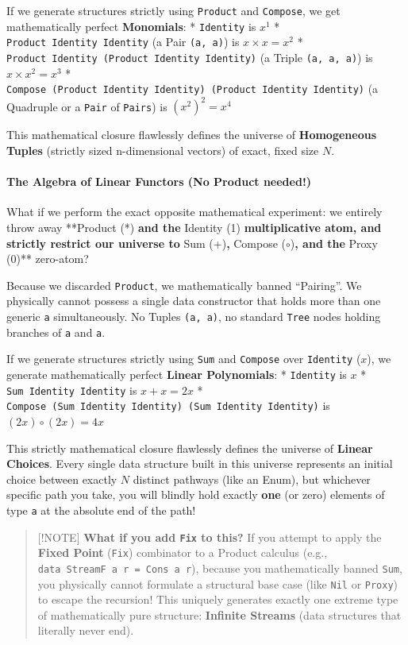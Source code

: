 \documentclass[
]{article}
\begin{document}
If we generate structures strictly using \texttt{Product} and
\texttt{Compose}, we get mathematically perfect \textbf{Monomials}: *
\texttt{Identity} is \(x^1\) * \texttt{Product\ Identity\ Identity} (a
Pair \texttt{(a,\ a)}) is \(x \times x = x^2\) *
\texttt{Product\ Identity\ (Product\ Identity\ Identity)} (a Triple
\texttt{(a,\ a,\ a)}) is \(x \times x^2 = x^3\) *
\texttt{Compose\ (Product\ Identity\ Identity)\ (Product\ Identity\ Identity)}
(a Quadruple or a \texttt{Pair} of \texttt{Pairs}) is \((x^2)^2 = x^4\)

This mathematical closure flawlessly defines the universe of
\textbf{Homogeneous Tuples} (strictly sized n-dimensional vectors) of
exact, fixed size \(N\).

\paragraph{The Algebra of Linear Functors (No Product
needed!)}\label{the-algebra-of-linear-functors-no-product-needed}

What if we perform the exact opposite mathematical experiment: we
entirely throw away **Product (*)\textbf{ and the }Identity (1)\textbf{
multiplicative atom, and strictly restrict our universe to }Sum
(+)\textbf{, }Compose (\(\circ\))\textbf{, and the }Proxy (0)**
zero-atom?

Because we discarded \texttt{Product}, we mathematically banned
``Pairing''. We physically cannot possess a single data constructor that
holds more than one generic \texttt{a} simultaneously. No Tuples
\texttt{(a,\ a)}, no standard \texttt{Tree} nodes holding branches of
\texttt{a} and \texttt{a}.

If we generate structures strictly using \texttt{Sum} and
\texttt{Compose} over \texttt{Identity} (\(x\)), we generate
mathematically perfect \textbf{Linear Polynomials}: * \texttt{Identity}
is \(x\) * \texttt{Sum\ Identity\ Identity} is \(x + x = 2x\) *
\texttt{Compose\ (Sum\ Identity\ Identity)\ (Sum\ Identity\ Identity)}
is \((2x) \circ (2x) = 4x\)

This strictly mathematical closure flawlessly defines the universe of
\textbf{Linear Choices}. Every single data structure built in this
universe represents an initial choice between exactly \(N\) distinct
pathways (like an Enum), but whichever specific path you take, you will
blindly hold exactly \textbf{one} (or zero) elements of type \texttt{a}
at the absolute end of the path!

\begin{quote}
{[}!NOTE{]} \textbf{What if you add \texttt{Fix} to this?} If you
attempt to apply the \textbf{Fixed Point} (\texttt{Fix}) combinator to a
Product calculus (e.g., \texttt{data\ StreamF\ a\ r\ =\ Cons\ a\ r}),
because you mathematically banned \texttt{Sum}, you physically cannot
formulate a structural base case (like \texttt{Nil} or \texttt{Proxy})
to escape the recursion! This uniquely generates exactly one extreme
type of mathematically pure structure: \textbf{Infinite Streams} (data
structures that literally never end).
\end{quote}
\end{document}
